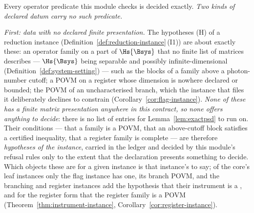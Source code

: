 
\begin{remark}\label{rem:exactboundary}
Every operator predicate this module checks is decided exactly. \emph{Two kinds
of declared datum carry no such predicate.}

\emph{First: data with no declared finite presentation.} The hypotheses (H) of
a reduction instance (Definition~\ref{def:reduction-instance}\,(I1)) are about
exactly these: an operator family on a part of $\Hs{\Bsys}$ that no finite
list of matrices describes --- $\Hs{\Bsys}$ being separable and possibly
infinite-dimensional (Definition~\ref{def:system-setting}) --- such as the blocks of a
family above a photon-number cutoff; a POVM on a register whose dimension is
nowhere declared or bounded; the POVM of an uncharacterised branch, which the
instance that files it deliberately declines to constrain
(Corollary~\ref{cor:flag-instance}). \emph{None of these has a finite matrix
presentation anywhere in this contract, so none offers anything to decide}:
there is no list of entries for Lemma~\ref{lem:exactpsd} to run on. Their
conditions --- that a family is a POVM, that an above-cutoff block satisfies
a certified inequality, that a register family is complete --- are therefore
\emph{hypotheses of the instance}, carried in the ledger and decided by this
module's refusal rules only to the extent that the declaration presents
something to decide. Which objects these are for a given instance is that
instance's to say; of the core's leaf instances only the flag instance has
one, its branch POVM, and the branching and register instances add the
hypothesis that their instrument is a , and for
the register form that the register family is a POVM
(Theorem~\ref{thm:instrument-instance},
Corollary~\ref{cor:register-instance}).


\end{remark}
